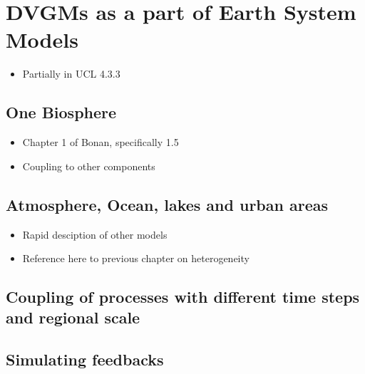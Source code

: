 \documentclass[
  12pt,
  oneside]{book}
\providecommand{\tightlist}{%
  \setlength{\itemsep}{0pt}\setlength{\parskip}{0pt}}
\begin{document}
\hypertarget{dvgms-as-a-part-of-earth-system-models}{%
\section{DVGMs as a part of Earth System Models}\label{dvgms-as-a-part-of-earth-system-models}}

\begin{itemize}
\tightlist
\item
  Partially in UCL 4.3.3
\end{itemize}

\hypertarget{one-biosphere}{%
\subsection{One Biosphere}\label{one-biosphere}}

\begin{itemize}
\tightlist
\item
  Chapter 1 of Bonan, specifically 1.5
\item
  Coupling to other components
\end{itemize}

\hypertarget{atmosphere-ocean-lakes-and-urban-areas}{%
\subsection{Atmosphere, Ocean, lakes and urban areas}\label{atmosphere-ocean-lakes-and-urban-areas}}

\begin{itemize}
\tightlist
\item
  Rapid desciption of other models
\item
  Reference here to previous chapter on heterogeneity
\end{itemize}

\hypertarget{coupling-of-processes-with-different-time-steps-and-regional-scale}{%
\subsection{Coupling of processes with different time steps and regional scale}\label{coupling-of-processes-with-different-time-steps-and-regional-scale}}

\hypertarget{simulating-feedbacks}{%
\subsection{Simulating feedbacks}\label{simulating-feedbacks}}
\end{document}
